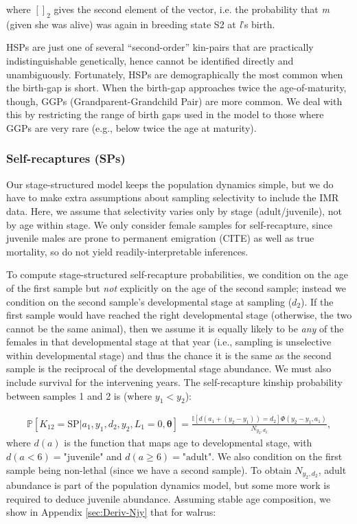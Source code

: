 where $\left[\right]_{2}$ gives the second element of the vector,
i.e. the probability that \textit{m} (given she was alive) was again
in breeding state S2 at \textit{l}'s birth.

HSPs are just one of several ``second-order'' kin-pairs that are
practically indistinguishable genetically, hence cannot be identified
directly and unambiguously. Fortunately, HSPs are demographically
the most common when the birth-gap is short. When the birth-gap approaches
twice the age-of-maturity, though, GGPs (Grandparent-Grandchild Pair)
are more common. We deal with this by restricting the range of birth
gaps used in the model to those where GGPs are very rare (e.g., below
twice the age at maturity).

\subsubsection{Self-recaptures (SPs)\label{subsec:selfPs}}

Our stage-structured model keeps the population dynamics simple, but
we do have to make extra assumptions about sampling selectivity to
include the IMR data. Here, we assume that selectivity varies only
by stage (adult/juvenile), not by age within stage. We only consider
female samples for self-recapture, since juvenile males are prone
to \textquotedbl permanent emigration\textquotedbl{} (CITE) as well
as true mortality, so do not yield readily-interpretable inferences.

To compute stage-structured self-recapture probabilities, we condition
on the age of the first sample but \emph{not} explicitly on the age
of the second sample; instead we condition on the second sample's
developmental stage at sampling ($d_{2}$). If the first sample would
have reached the right developmental stage (otherwise, the two cannot
be the same animal), then we assume it is equally likely to be \emph{any}
of the females in that developmental stage at that year (i.e., sampling
is unselective within developmental stage) and thus the chance it
is the same as the second sample is the reciprocal of the developmental
stage abundance. We must also include survival for the intervening
years. The self-recapture kinship probability between samples 1 and
2 is (where $y_{1}<y_{2}$):

\begin{gather}
\mathbb{P}\left[K_{12}=\text{SP}\vert a_{1},y_{1},d_{2},y_{2},L_{1}=0,\boldsymbol{\theta}\right]=\frac{\mathbb{I}\left[d\left(a_{1}+\left(y_{2}-y_{1}\right)\right)=d_{2}\right]\Phi\left(y_{2}-y_{1},a_{1}\right)}{N_{y_{2},d_{2}}},\label{eq:self-staged}
\end{gather}
where $d\left(a\right)$ is the function that maps age to developmental
stage, with $d\left(a<6\right)=\text{"juvenile"}$ and $d\left(a\geqslant6\right)=\text{"adult"}$.
We also condition on the first sample being non-lethal (since we have
a second sample). To obtain $N_{y_{2},d_{2}}$, adult abundance is
part of the population dynamics model, but some more work is required
to deduce juvenile abundance. Assuming stable age composition, we
show in Appendix \ref{sec:Deriv-Njy} that for walrus:

